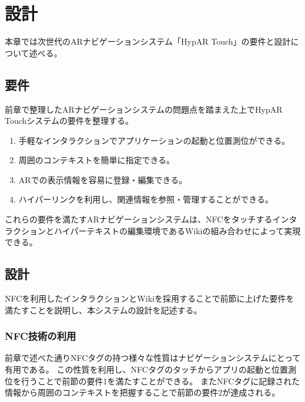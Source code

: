 \chapter{設計}
\label{chap:design}

本章では次世代のARナビゲーションシステム「HypAR Touch」の要件と設計について述べる。

\newpage

\section{要件}
前章で整理したARナビゲーションシステムの問題点を踏まえた上でHypAR Touchシステムの要件を整理する。
\begin{enumerate}
  \item 手軽なインタラクションでアプリケーションの起動と位置測位ができる。
  \item 周囲のコンテキストを簡単に指定できる。
  \item ARでの表示情報を容易に登録・編集できる。
  \item ハイパーリンクを利用し、関連情報を参照・管理することができる。
\end{enumerate}
これらの要件を満たすARナビゲーションシステムは、NFCをタッチするインタラクションとハイパーテキストの編集環境であるWikiの組み合わせによって実現できる。

\section{設計}
NFCを利用したインタラクションとWikiを採用することで前節に上げた要件を満たすことを説明し、本システムの設計を記述する。

\subsection{NFC技術の利用}
前章で述べた通りNFCタグの持つ様々な性質はナビゲーションシステムにとって有用である。
この性質を利用し、NFCタグのタッチからアプリの起動と位置測位を行うことで前節の要件1を満たすことができる。
またNFCタグに記録された情報から周囲のコンテキストを把握することで前節の要件2が達成される。

